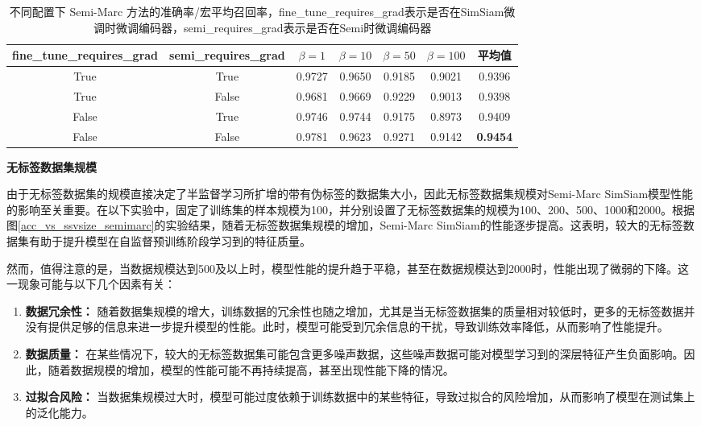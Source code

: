 \documentclass[master]{thesis-uestc}
\begin{document}
\begin{table}[h]
    \centering
    \caption{不同配置下 Semi-Marc 方法的准确率/宏平均召回率，fine\_tune\_requires\_grad表示是否在SimSiam微调时微调编码器，semi\_requires\_grad表示是否在Semi时微调编码器}
    \begin{tabular}{ccccccc}
    \toprule
    fine\_tune\_requires\_grad & semi\_requires\_grad & $\beta=1$ & $\beta=10$ & $\beta=50$ & $\beta=100$ & 平均值 \\
    \midrule
    True  & True  & 0.9727 & 0.9650 & 0.9185 & 0.9021 & 0.9396 \\
    True  & False & 0.9681 & 0.9669 & 0.9229 & 0.9013 & 0.9398 \\
    False & True  & 0.9746 & 0.9744 & 0.9175 & 0.8973 & 0.9409 \\
    False & False & 0.9781 & 0.9623 & 0.9271 & 0.9142 & \textbf{0.9454} \\
    \bottomrule
    \end{tabular}
    \label{tab:require_grad_discuss}
\end{table}

\textbf{无标签数据集规模}

由于无标签数据集的规模直接决定了半监督学习所扩增的带有伪标签的数据集大小，因此无标签数据集规模对Semi-Marc SimSiam模型性能的影响至关重要。在以下实验中，固定了训练集的样本规模为100，并分别设置了无标签数据集的规模为100、200、500、1000和2000。根据图\ref{acc_vs_ssvsize_semimarc}的实验结果，随着无标签数据集规模的增加，Semi-Marc SimSiam的性能逐步提高。这表明，较大的无标签数据集有助于提升模型在自监督预训练阶段学习到的特征质量。

然而，值得注意的是，当数据规模达到500及以上时，模型性能的提升趋于平稳，甚至在数据规模达到2000时，性能出现了微弱的下降。这一现象可能与以下几个因素有关：

\begin{enumerate}[label={(\arabic*)}]
    \item \textbf{数据冗余性：} 随着数据集规模的增大，训练数据的冗余性也随之增加，尤其是当无标签数据集的质量相对较低时，更多的无标签数据并没有提供足够的信息来进一步提升模型的性能。此时，模型可能受到冗余信息的干扰，导致训练效率降低，从而影响了性能提升。
    \item \textbf{数据质量：} 在某些情况下，较大的无标签数据集可能包含更多噪声数据，这些噪声数据可能对模型学习到的深层特征产生负面影响。因此，随着数据规模的增加，模型的性能可能不再持续提高，甚至出现性能下降的情况。
    \item \textbf{过拟合风险：} 当数据集规模过大时，模型可能过度依赖于训练数据中的某些特征，导致过拟合的风险增加，从而影响了模型在测试集上的泛化能力。
\end{enumerate}
\end{document}
